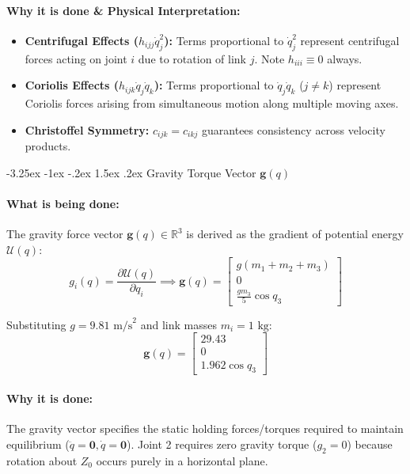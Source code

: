 \documentclass[11pt, a4paper]{article}
\makeatletter
\renewcommand{\subsection}{\@startsection{subsection}{2}{\z@}%
    {-3.25ex \@plus -1ex \@minus -.2ex}%
    {1.5ex \@plus .2ex}%
    {\normalfont\large\bfseries\color{brandaccent}}}
\makeatother
\begin{document}
\paragraph{Why it is done \& Physical Interpretation:}
\begin{itemize}[leftmargin=1.5em]
    \item \textbf{Centrifugal Effects ($h_{ijj}\dot{q}_j^2$):} Terms proportional to $\dot{q}_j^2$ represent centrifugal forces acting on joint $i$ due to rotation of link $j$. Note $h_{iii} \equiv 0$ always.
    \item \textbf{Coriolis Effects ($h_{ijk}\dot{q}_j\dot{q}_k$):} Terms proportional to $\dot{q}_j\dot{q}_k$ ($j \neq k$) represent Coriolis forces arising from simultaneous motion along multiple moving axes.
    \item \textbf{Christoffel Symmetry:} $c_{ijk} = c_{ikj}$ guarantees consistency across velocity products.
\end{itemize}

\subsection{Gravity Torque Vector \texorpdfstring{$\mathbf{g}(q)$}{g(q)}}
\paragraph{What is being done:}
The gravity force vector $\mathbf{g}(q) \in \mathbb{R}^3$ is derived as the gradient of potential energy $\mathcal{U}(q)$:
\begin{equation}
    g_i(q) = \frac{\partial \mathcal{U}(q)}{\partial q_i} \implies \mathbf{g}(q) = \begin{bmatrix} g(m_1 + m_2 + m_3) \\[0.4em] 0 \\[0.4em] \frac{g m_3}{5}\cos q_3 \end{bmatrix}
\end{equation}

Substituting $g = 9.81\text{ m/s}^2$ and link masses $m_i = 1\text{ kg}$:
\begin{equation}
    \mathbf{g}(q) = \begin{bmatrix} 29.43 \\[0.3em] 0 \\[0.3em] 1.962\cos q_3 \end{bmatrix}
\end{equation}

\paragraph{Why it is done:}
The gravity vector specifies the static holding forces/torques required to maintain equilibrium ($\ddot{q}=\mathbf{0}, \dot{q}=\mathbf{0}$). Joint 2 requires zero gravity torque ($g_2 = 0$) because rotation about $Z_0$ occurs purely in a horizontal plane.
\end{document}
